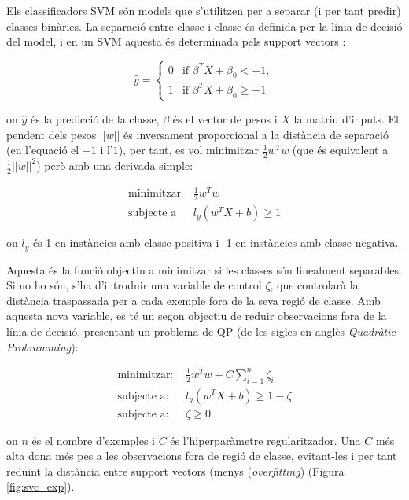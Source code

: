 \documentclass[12pt, spanish]{article}
\begin{document}
 Els classificadors SVM són models que s'utilitzen per a separar (i per tant predir) classes binàries. La separació entre classe i classe és definida per la línia de decisió del model, i en un SVM aquesta és determinada pels support vectors \cite[Cap. 5]{geron2019hands}: 

$$
\hat{y} = \begin{cases} 
0 & \text{if } \beta^T X + \beta_0 < - 1, \\ 
1 & \text{if } \beta^T X + \beta_0 \ge + 1
\end{cases}
$$

on $\hat{y}$ és la predicció de la classe, $\beta$ és el vector de pesos i $X$ la matriu d'inputs. El pendent dels pesos $||w||$ és inversament proporcional a la distància de separació (en l'equació el $-1$ i l'$1$), per tant, es vol minimitzar $ \frac{1}{2} w^T w$ (que és equivalent a $ \frac{1}{2}||w||^2$) però amb una derivada simple:


\begin{equation} 
\begin{split}
\text{minimitzar } & \frac{1}{2} w^T w \\
\text{subjecte a }&  l_y (w^T X + b) \ge 1
\end{split}
\end{equation}

on $l_y$ és 1 en instàncies amb classe positiva i -1 en instàncies amb classe negativa.

Aquesta és la funció objectiu a minimitzar si les classes són linealment separables. Si no ho són, s'ha d'introduir una variable de control $\zeta$, que controlarà la distància traspassada per a cada exemple fora de la seva regió de classe. Amb aquesta nova variable, es té un segon objectiu de reduir observacions fora de la línia de decisió, presentant un problema de QP (de les sigles en anglès \textit{Quadràtic Probramming}):

\begin{equation} 
\begin{split}
\text{minimitzar: } & \frac{1}{2} w^T w + C \sum^n_{i = 1} \zeta_i \\
\text{subjecte a: }&  l_y (w^T X + b) \ge 1 - \zeta \\
\text{subjecte a: }& \zeta \ge 0
\end{split}
\end{equation}

on $n$ és el nombre d'exemples i $C$ és l'hiperparàmetre regularitzador. Una $C$ més alta dona més pes a  les observacions fora de regió de classe, evitant-les i per tant reduint la distància entre support vectors (menys (\textit{overfitting}) (Figura \ref{fig:svc_exp}).
\end{document}
